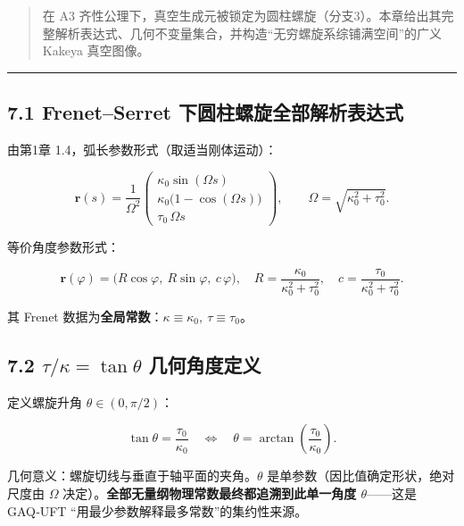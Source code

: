 \begin{quote}
在 A3
齐性公理下，真空生成元被锁定为圆柱螺旋（分支3）。本章给出其完整解析表达式、几何不变量集合，并构造``无穷螺旋系综铺满空间''的广义
Kakeya 真空图像。
\end{quote}

\begin{center}\rule{0.5\linewidth}{0.5pt}\end{center}

\subsection{7.1 Frenet--Serret
下圆柱螺旋全部解析表达式}\label{frenetserret-ux4e0bux5706ux67f1ux87baux65cbux5168ux90e8ux89e3ux6790ux8868ux8fbeux5f0f}

由第1章 1.4，弧长参数形式（取适当刚体运动）：

\[
\mathbf{r}(s)=\frac{1}{\Omega^2}
\begin{pmatrix}
\kappa_0\sin(\Omega s)\\
\kappa_0\bigl(1-\cos(\Omega s)\bigr)\\
\tau_0\,\Omega s
\end{pmatrix},\qquad \Omega=\sqrt{\kappa_0^2+\tau_0^2}.
\]

等价角度参数形式：

\[
\mathbf{r}(\varphi)=\bigl(R\cos\varphi,\ R\sin\varphi,\ c\,\varphi\bigr),\quad
R=\frac{\kappa_0}{\kappa_0^2+\tau_0^2},\quad c=\frac{\tau_0}{\kappa_0^2+\tau_0^2}.
\]

其 Frenet
数据为\textbf{全局常数}：\(\kappa\equiv\kappa_0,\ \tau\equiv\tau_0\)。

\subsection{\texorpdfstring{7.2 \(\tau/\kappa=\tan\theta\)
几何角度定义}{7.2 \textbackslash tau/\textbackslash kappa=\textbackslash tan\textbackslash theta 几何角度定义}}\label{taukappatantheta-ux51e0ux4f55ux89d2ux5ea6ux5b9aux4e49}

定义螺旋升角 \(\theta\in(0,\pi/2)\)：

\[
\tan\theta=\frac{\tau_0}{\kappa_0}\quad\Longleftrightarrow\quad \theta=\arctan\!\left(\frac{\tau_0}{\kappa_0}\right).
\]

几何意义：螺旋切线与垂直于轴平面的夹角。\(\theta\)
是单参数（因比值确定形状，绝对尺度由 \(\Omega\)
决定）。\textbf{全部无量纲物理常数最终都追溯到此单一角度
\(\theta\)}------这是 GAQ‑UFT ``用最少参数解释最多常数''的集约性来源。

